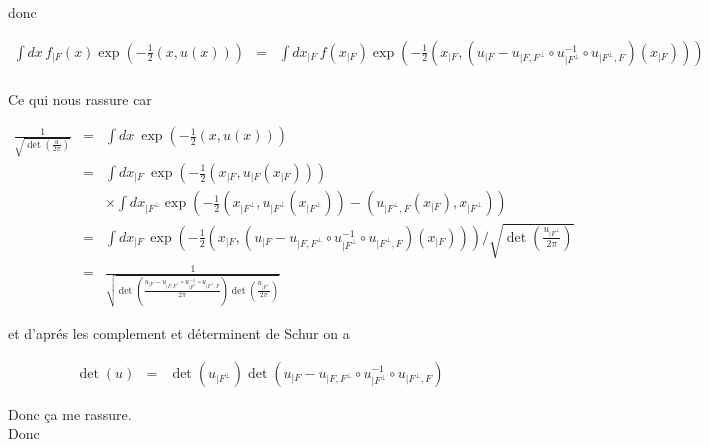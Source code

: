 donc 

\begin{eqnarray*}
	\int d x \, f_{\vert F}(x) \exp \left ( - \frac{1}{2} ( x , u (x)) \right )  & = & \int d x_{\vert F} \,  f(x_{\vert F}) \exp \left ( - \frac{1}{2} \left ( x_{\vert F } , \left ( u_{\vert F }- u_{\vert F, F^\perp} \circ u_{\vert F^\perp}^{-1} \circ u_{\vert F^\perp, F} \right ) \left (x_{\vert F } \right ) \right ) \right ) \\	
\end{eqnarray*}

Ce qui nous rassure car 

\begin{eqnarray*}
	\frac{1}{\sqrt{ \det \left( \frac{u}{2\pi} \right) }} & = & \int d x \ \exp \left ( - \frac{1}{2} ( x , u (x)) \right )\\	
	& = & \int d x_{\vert F} \ \exp \left ( - \frac{1}{2} \left ( x_{\vert F } , u_{\vert F } \left (x_{\vert F } \right ) \right ) \right ) \\
	&& \times \int d x_{\vert F^\perp}\exp \left ( - \frac{1}{2} \left ( x_{\vert F^\perp } , u_{\vert F^\perp } \left (x_{\vert F^\perp } \right ) \right ) - \left ( u_{\vert F^\perp , F   }\left (x_{\vert F } \right )  ,  x_{\vert F^\perp }  \right ) \right )	\\
	& = & 	\int d x_{\vert F} \, \exp \left ( - \frac{1}{2} \left ( x_{\vert F } , \left ( u_{\vert F }- u_{\vert F, F^\perp} \circ u_{\vert F^\perp}^{-1} \circ u_{\vert F^\perp, F} \right ) \left (x_{\vert F } \right ) \right ) \right )/\sqrt{ \det \left( \frac{u_{\vert F^\perp}}{2\pi} \right) }\\
	& = & \frac{1}{\sqrt{ \det \left( \frac{u_{\vert F }- u_{\vert F, F^\perp} \circ u_{\vert F^\perp}^{-1} \circ u_{\vert F^\perp, F}}{2\pi} \right)\det \left( \frac{u_{\vert F^\perp}}{2\pi} \right)}} 
\end{eqnarray*}

et d'aprés les complement et déterminent de Schur on a 

\begin{eqnarray*}
	\det (u ) & = & \det \left(u_{\vert F^\perp} \right) \det \left(u_{\vert F }- u_{\vert F, F^\perp} \circ u_{\vert F^\perp}^{-1} \circ u_{\vert F^\perp, F} \right)	
\end{eqnarray*}

Donc ça me rassure.\\

Donc


